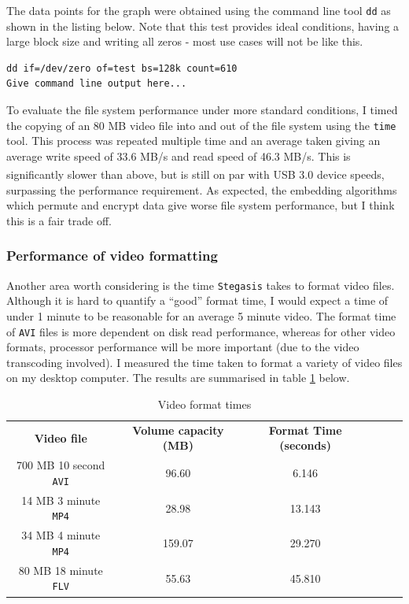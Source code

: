 \documentclass[paper=a4, fontsize=11pt,twoside]{scrartcl}
\numberwithin{table}{section}
\numberwithin{figure}{section}
\numberwithin{algorithm}{section}
\begin{document}
The data points for the graph were obtained using the command line tool \texttt{dd} as shown in the listing below. Note that this test provides ideal conditions, having a large block size and writing all zeros - most use cases will not be like this.

\begin{lstlisting}[caption={Testing the file system performance using \texttt{dd}.}, frame=single, label=dd,float,floatplacement=!htH]
dd if=/dev/zero of=test bs=128k count=610
Give command line output here...
\end{lstlisting}

To evaluate the file system performance under more standard conditions, I timed the copying of an 80 MB video file into and out of the file system using the \texttt{time} tool. This process was repeated multiple time and an average taken giving an average write speed of 33.6 MB/s and read speed of 46.3 MB/s. This is significantly slower than above, but is still on par with USB 3.0 device speeds\textsuperscript{\cite{usb3}}, surpassing the performance requirement. As expected, the embedding algorithms which permute and encrypt data give worse file system performance, but I think this is a fair trade off.

\subsubsection{Performance of video formatting}

Another area worth considering is the time \texttt{Stegasis} takes to format video files. Although it is hard to quantify a ``good'' format time, I would expect a time of under 1 minute to be reasonable for an average 5 minute video. The format time of \texttt{AVI} files is more dependent on disk read performance, whereas for other video formats, processor performance will be more important (due to the video transcoding involved). I measured the time taken to format a variety of video files on my desktop computer. The results are summarised in table \ref{formatres} below.

\begin{table}[h]
\centering
\begin{tabular}{|c|c|c|lll}
\cline{1-3}
\textbf{Video file} & \textbf{Volume capacity (MB)} & \textbf{Format Time (seconds)}      \\ \cline{1-3}
700 MB 10 second \texttt{AVI} & 96.60 & 6.146   \\ \cline{1-3}
14 MB 3 minute \texttt{MP4} & 28.98 & 13.143   \\ \cline{1-3}
34 MB 4 minute \texttt{MP4} & 159.07 & 29.270   \\ \cline{1-3}
80 MB 18 minute \texttt{FLV} & 55.63 & 45.810  \\ \cline{1-3}
\end{tabular}
\caption{Video format times}
\label{formatres}
\end{table}
\end{document}
